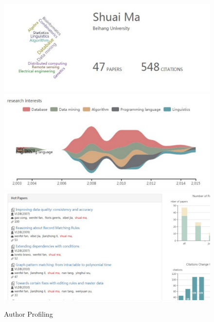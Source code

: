 \begin{figure}
\centering
\includegraphics[width=\columnwidth]{msWordCloud.pdf}
\includegraphics[width=\columnwidth]{msInterest.pdf}
\includegraphics[width=\columnwidth]{msPapers.pdf}
\caption{Author Profiling}
\label{fig:msProfile}
\end{figure}

